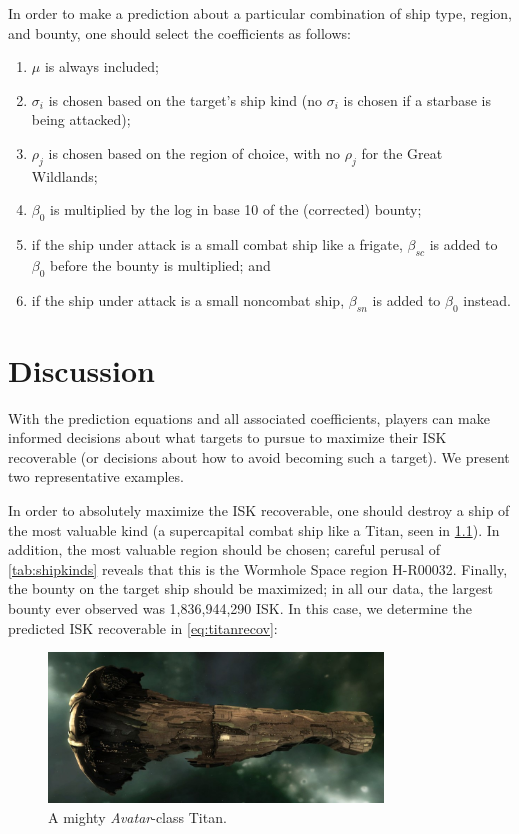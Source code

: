 \documentclass[letterpaper,12pt,article]{memoir}
\begin{document}
In order to make a prediction about a particular combination of ship type,
region, and bounty, one should select the coefficients as follows:
\begin{enumerate}[nolistsep,label=\textbf{--}]
    \item $\mu$ is always included;
    \item $\sigma_i$ is chosen based on the target's ship kind (no $\sigma_i$
    is chosen if a starbase is being attacked);
    \item $\rho_j$ is chosen based on the region of choice, with no $\rho_j$ for
    the Great Wildlands;
    \item $\beta_0$ is multiplied by the log in base 10 of the (corrected) bounty;
    \item if the ship under attack is a small combat ship like a frigate, 
    $\beta_{sc}$ is added to $\beta_0$ before the bounty is multiplied; and
    \item if the ship under attack is a small noncombat ship, $\beta_{sn}$ is 
    added to $\beta_0$ instead.
\end{enumerate}

\clearpage
\chapter{Discussion}
\label{sec:disc}

With the prediction equations and all associated coefficients, players can make
informed decisions about what targets to pursue to maximize their ISK recoverable
(or decisions about how to avoid becoming such a target). We present two 
representative examples. \bigskip

In order to absolutely maximize the ISK recoverable, one should destroy a ship
of the most valuable kind (a supercapital combat ship like a Titan, seen in 
\cref{fig:titan}). In addition, the most valuable region should be chosen; careful
perusal of \cref{tab:shipkinds}  reveals that this is the Wormhole Space region
H-R00032. Finally, the bounty on the target ship should be maximized; in all our
data, the largest bounty ever observed was 1,836,944,290 ISK. In this case, we
determine the predicted ISK recoverable in \cref{eq:titanrecov}:

\begin{figure}[ht]
    \centering
    \includegraphics[width=3.5in]{avatarTitan.jpg}
    \caption{A mighty \textit{Avatar}-class Titan. \cite{avatar}}
    \label{fig:titan}
\end{figure}
\end{document}

